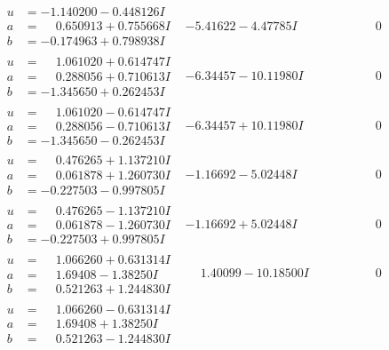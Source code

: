 \documentclass[1p]{elsarticle_modified}
\theoremstyle{definition}
\begin{document}
$$\begin{array}{c|c|c}
\begin{aligned}
u &= -1.140200 - 0.448126 I \\
a &= \phantom{-}0.650913 + 0.755668 I \\
b &= -0.174963 + 0.798938 I\end{aligned}
 & -5.41622 - 4.47785 I & \phantom{-0.000000 } 0 \\ \hline\begin{aligned}
u &= \phantom{-}1.061020 + 0.614747 I \\
a &= \phantom{-}0.288056 + 0.710613 I \\
b &= -1.345650 + 0.262453 I\end{aligned}
 & -6.34457 - 10.11980 I & \phantom{-0.000000 } 0 \\ \hline\begin{aligned}
u &= \phantom{-}1.061020 - 0.614747 I \\
a &= \phantom{-}0.288056 - 0.710613 I \\
b &= -1.345650 - 0.262453 I\end{aligned}
 & -6.34457 + 10.11980 I & \phantom{-0.000000 } 0 \\ \hline\begin{aligned}
u &= \phantom{-}0.476265 + 1.137210 I \\
a &= \phantom{-}0.061878 + 1.260730 I \\
b &= -0.227503 - 0.997805 I\end{aligned}
 & -1.16692 - 5.02448 I & \phantom{-0.000000 } 0 \\ \hline\begin{aligned}
u &= \phantom{-}0.476265 - 1.137210 I \\
a &= \phantom{-}0.061878 - 1.260730 I \\
b &= -0.227503 + 0.997805 I\end{aligned}
 & -1.16692 + 5.02448 I & \phantom{-0.000000 } 0 \\ \hline\begin{aligned}
u &= \phantom{-}1.066260 + 0.631314 I \\
a &= \phantom{-}1.69408 - 1.38250 I \\
b &= \phantom{-}0.521263 + 1.244830 I\end{aligned}
 & \phantom{-}1.40099 - 10.18500 I & \phantom{-0.000000 } 0 \\ \hline\begin{aligned}
u &= \phantom{-}1.066260 - 0.631314 I \\
a &= \phantom{-}1.69408 + 1.38250 I \\
b &= \phantom{-}0.521263 - 1.244830 I\end{aligned}

\end{array}$$
\end{document}
